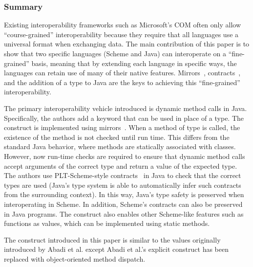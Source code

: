 \documentclass[letterpaper]{llncs}
\begin{document}
\subsubsection*{Summary}
Existing interoperability frameworks such as Microsoft's COM often only allow ``course-grained'' interoperability because they require that all languages use a universal format when exchanging data. The main contribution of this paper is to show that two specific languages (Scheme and Java) can interoperate on a ``fine-grained'' basis, meaning that by extending each language in specific ways, the languages can retain use of many of their native features. Mirrors~\cite{Bracha2004Mirrors}, contracts~\cite{Findler2002Contracts}, and the addition of a \dynamic type to Java are the keys to achieving this ``fine-grained'' interoperability.

The primary interoperability vehicle introduced is dynamic method calls in Java. Specifically, the authors add a \dynamic keyword that can be used in place of a type. The \dynamic construct is implemented using mirrors~\cite{Bracha2004Mirrors}. When a method of type \dynamic is called, the existence of the method is not checked until run time. This differs from the standard Java behavior, where methods are statically associated with classes. However, now run-time checks are required to ensure that dynamic method calls accept arguments of the correct type and return a value of the expected type. The authors use PLT-Scheme-style contracts~\cite{Findler2002Contracts} in Java to check that the correct types are used (Java's type system is able to automatically infer such contracts from the surrounding context). In this way, Java's type safety is preserved when interoperating in Scheme. In addition, Scheme's contracts can also be preserved in Java programs. The \dynamic construct also enables other Scheme-like features such as functions as values, which can be implemented using \dynamic static methods.

The \dynamic construct introduced in this paper is similar to the \Dynamic values originally introduced by Abadi et al. except Abadi et al.'s explicit \typecase construct has been replaced with object-oriented method dispatch.




\end{document}
